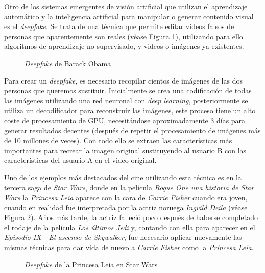 Otro de los sistemas emergentes de visión artificial que utilizan el aprendizaje automático y la inteligencia artificial para manipular o generar contenido visual es el \textit{deepfake}. Se trata de una técnica que permite editar videos falsos de personas que aparentemente son reales (véase Figura \ref{fig:Obama}), utilizando para ello algoritmos de aprendizaje no supervisado, y videos o imágenes ya existentes. 

\begin{figure}[h!]
    \centering
    \caption{\textit{Deepfake} de Barack Obama}
    \label{fig:Obama}  
\end{figure}

Para crear un \textit{deepfake}\cite{Deepfake}, es necesario recopilar cientos de imágenes de las dos personas que queremos sustituir. Inicialmente se crea una codificación de todas las imágenes utilizando una red neuronal con \textit{deep learning}, posteriormente se utiliza un decodificador para reconstruir las imágenes, este proceso tiene un alto coste de procesamiento de GPU, necesitándose aproximadamente 3 días para generar resultados decentes (después de repetir el procesamiento de imágenes más de 10 millones de veces). Con todo ello se extraen las características más importantes para recrear la imagen original sustituyendo al usuario B con las características del usuario A en el video original.

Uno de los ejemplos más destacados del cine utilizando esta técnica es en la tercera saga de \textit{Star Wars}, donde en la película \textit{Rogue One una historia de Star Wars} la \textit{Princesa Leia} aparece con la cara de \textit{Carrie Fisher} cuando era joven, cuando en realidad fue interpretada por la actriz noruega \textit{Ingvild Deila} (véase Figura \ref{fig:Leia}). Años más tarde, la actriz falleció poco después de haberse completado el rodaje de la película \textit{Los últimos Jedi} y, contando con ella para aparecer en el \textit{Episodio IX - El ascenso de Skywalker}, fue necesario aplicar nuevamente las mismas técnicas para dar vida de nuevo a \textit{Carrie Fisher} como la \textit{Princesa Leia}.

\begin{figure}[h!]
    \centering
    \caption{\textit{Deepfake} de la Princesa Leia en Star Wars}
    \label{fig:Leia}  
\end{figure}

